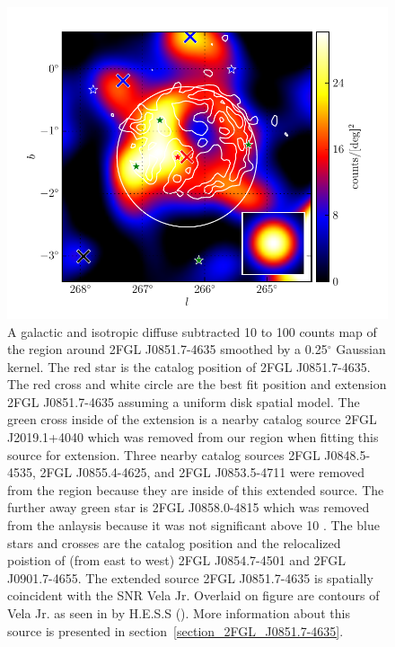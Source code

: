 \documentclass[12pt,preprint]{aastex}
\newcommand{\gev}{\text{GeV}\xspace}
\newcommand{\tev}{\text{TeV}\xspace}
\renewcommand{\deg}{\ensuremath{^\circ}\xspace}
\begin{document}
\begin{figure}
  \begin{center}
    \includegraphics[type=pdf,ext=.pdf,read=.pdf]{source_plots/source_Vela_Jr}
  \end{center}
  \caption{A galactic and isotropic diffuse subtracted 10 \gev to 100
  \gev counts map of the region around 2FGL J0851.7-4635 smoothed by a
  0.25\deg Gaussian kernel. The red star is the catalog position of 2FGL
  J0851.7-4635.  The red cross and white circle are the best fit position
  and extension 2FGL J0851.7-4635 assuming a uniform disk spatial model.
  The green cross inside of the extension is a nearby catalog source
  2FGL J2019.1+4040 which was removed from our region when fitting this
  source for extension.  Three nearby catalog sources 2FGL J0848.5-4535,
  2FGL J0855.4-4625, and 2FGL J0853.5-4711 were removed from the region
  because they are inside of this extended source.  The further away
  green star is 2FGL J0858.0-4815 which was removed from the anlaysis
  because it was not significant above 10 \gev.  The blue stars and
  crosses are the catalog position and the relocalized poistion of (from
  east to west) 2FGL J0854.7-4501 and 2FGL J0901.7-4655.   The extended
  source 2FGL J0851.7-4635 is spatially coincident with the SNR Vela Jr.
  Overlaid on figure are contours of Vela Jr. as  seen in \tev by H.E.S.S
  (\cite{vela_jr_hess}).  More information about this source is presented
  in section~\ref{section_2FGL_J0851.7-4635}.
  }\label{Vela_Jr}
\end{figure}
\end{document}
